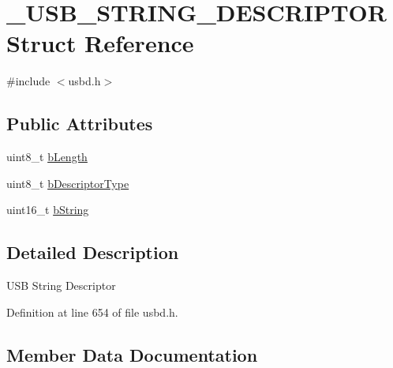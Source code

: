 \hypertarget{struct___u_s_b___s_t_r_i_n_g___d_e_s_c_r_i_p_t_o_r}{}\section{\+\_\+\+U\+S\+B\+\_\+\+S\+T\+R\+I\+N\+G\+\_\+\+D\+E\+S\+C\+R\+I\+P\+T\+OR Struct Reference}
\label{struct___u_s_b___s_t_r_i_n_g___d_e_s_c_r_i_p_t_o_r}


{\ttfamily \#include $<$usbd.\+h$>$}

\subsection*{Public Attributes}
\begin{DoxyCompactItemize}
\item 
uint8\+\_\+t \hyperlink{struct___u_s_b___s_t_r_i_n_g___d_e_s_c_r_i_p_t_o_r_a27d5cd3019611e53d3588192d4c72b05}{b\+Length}
\item 
uint8\+\_\+t \hyperlink{struct___u_s_b___s_t_r_i_n_g___d_e_s_c_r_i_p_t_o_r_a03f4e8b870398d2410b49adce1466054}{b\+Descriptor\+Type}
\item 
uint16\+\_\+t \hyperlink{struct___u_s_b___s_t_r_i_n_g___d_e_s_c_r_i_p_t_o_r_abbe1c4825365ecb9af165153435a6ef4}{b\+String}
\end{DoxyCompactItemize}


\subsection{Detailed Description}
U\+SB String Descriptor 

Definition at line 654 of file usbd.\+h.



\subsection{Member Data Documentation}
\mbox{\label{struct___u_s_b___s_t_r_i_n_g___d_e_s_c_r_i_p_t_o_r_a03f4e8b870398d2410b49adce1466054}} 
